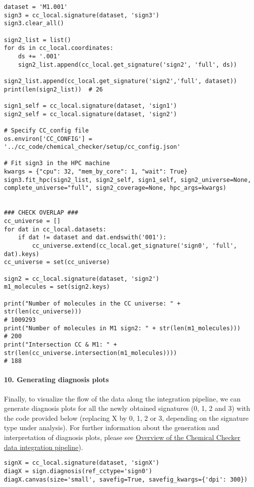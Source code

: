 \begin{lstlisting}
dataset = 'M1.001'
sign3 = cc_local.signature(dataset, 'sign3')
sign3.clear_all()

sign2_list = list()
for ds in cc_local.coordinates:
    ds += '.001'
    sign2_list.append(cc_local.get_signature('sign2', 'full', ds))

sign2_list.append(cc_local.get_signature('sign2','full', dataset))
print(len(sign2_list))  # 26

sign1_self = cc_local.signature(dataset, 'sign1')
sign2_self = cc_local.signature(dataset, 'sign2')

# Specify CC_config file
os.environ['CC_CONFIG'] = '../cc_code/chemical_checker/setup/cc_config.json'

# Fit sign3 in the HPC machine
kwargs = {"cpu": 32, "mem_by_core": 1, "wait": True}
sign3.fit_hpc(sign2_list, sign2_self, sign1_self, sign2_universe=None, complete_universe="full", sign2_coverage=None, hpc_args=kwargs)


### CHECK OVERLAP ###
cc_universe = []
for dat in cc_local.datasets:
    if dat != dataset and dat.endswith('001'):
        cc_universe.extend(cc_local.get_signature('sign0', 'full', dat).keys)
cc_universe = set(cc_universe)

sign2 = cc_local.signature(dataset, 'sign2')
m1_molecules = set(sign2.keys)

print("Number of molecules in the CC universe: " + str(len(cc_universe)))
# 1009293
print("Number of molecules in M1 sign2: " + str(len(m1_molecules)))
# 200
print("Intersection CC & M1: " + str(len(cc_universe.intersection(m1_molecules))))
# 188
\end{lstlisting}


\paragraph{10. Generating diagnosis plots} \leavevmode

Finally, to visualize the flow of the data along the integration pipeline, we can generate diagnosis plots for all the newly obtained signatures (0, 1, 2 and 3) with the code provided below (replacing X by 0, 1, 2 or 3, depending on the signature type under analysis). For further information about the generation and interpretation of diagnosis plots, please see \hyperref[Overview of the Chemical Checker data integration pipeline]{Overview of the Chemical Checker data integration pipeline}). \\

\begin{lstlisting}
signX = cc_local.signature(dataset, 'signX')
diagX = sign.diagnosis(ref_cctype='sign0')
diagX.canvas(size='small', savefig=True, savefig_kwargs={'dpi': 300})
\end{lstlisting}
